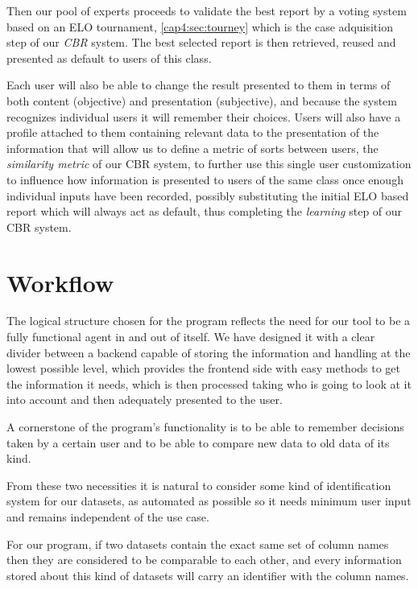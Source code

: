 Then our pool of experts proceeds to validate the best report by a voting system based on an ELO tournament, \ref{cap4:sec:tourney} which is the case adquisition step of our \textit{CBR} system. 
The best selected report is then retrieved, reused and presented as default to users of this class. 

Each user will also be able to change the result presented to them in terms of both content (objective) and presentation (subjective), and because the system recognizes individual users it will remember their choices.
Users will also have a profile attached to them containing relevant data to the presentation of the information that will allow us to define a metric of sorts between users, the \textit{similarity metric} of our CBR system, to further use this single user customization to influence how information is presented to users of the same class once enough individual inputs have been recorded, possibly substituting the initial ELO based report which will always act as default, thus completing the \textit{learning} step of our CBR system.



\section{Workflow}
\label{cap1:sec:workflow}

The logical structure chosen for the program reflects the need for our tool to be a fully functional agent in and out of itself. We have designed it with a clear divider between a backend capable of storing the information and handling at the lowest possible level, which provides the frontend side with easy methods to get the information it needs, which is then processed taking who is going to look at it into account and then adequately presented to the user.

A cornerstone of the program's functionality is to be able to remember decisions taken by a certain user and to be able to compare new data to old data of its kind.

From these two necessities it is natural to consider some kind of identification system for our datasets, as automated as possible so it needs minimum user input and remains independent of the use case.

For our program, if two datasets contain the exact same set of column names then they are considered to be comparable to each other, and every information stored about this kind of datasets will carry an identifier with the column names.

